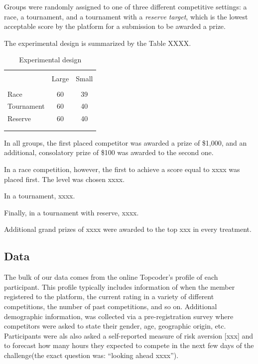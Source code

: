 \documentclass[12pt,]{article}
\begin{document}
Groups were randomly assigned to one of three different competitive
settings: a race, a tournament, and a tournament with a \emph{reserve
target}, which is the lowest acceptable score by the platform for a
submission to be awarded a prize.

The experimental design is summarized by the Table XXXX.

\begin{table}
\centering
\caption{Experimental design}
\label{tab: experimental design}
\begin{tabular}{@{}lcc}
  \\[-1.8ex]\hline \hline \\[-1.8ex]
 & Large & Small \\ 
  \hline \\[-1.86ex]
Race & 60 & 39 \\ 
  Tournament & 60 & 40 \\ 
  Reserve & 60 & 40 \\ 
   \\[-1.8ex]\hline \hline \\[-1.8ex]
\end{tabular}
\end{table}

In all groups, the first placed competitor was awarded a prize of
\$1,000, and an additional, consolatory prize of \$100 was awarded to
the second one.

In a race competition, however, the first to achieve a score equal to
xxxx was placed first. The level was chosen xxxx.

In a tournament, xxxx.

Finally, in a tournament with reserve, xxxx.

Additional grand prizes of xxxx were awarded to the top xxx in every
treatment.

\subsection{Data}\label{data}

The bulk of our data comes from the online Topcoder's profile of each
participant. This profile typically includes information of when the
member registered to the platform, the current rating in a variety of
different competitions, the number of past competitions, and so on.
Additional demographic information, was collected via a pre-registration
survey where competitors were asked to state their gender, age,
geographic origin, etc. Participants were als also asked a self-reported
measure of risk aversion {[}xxx{]} and to forecast how many hours they
expected to compete in the next few days of the challenge(the exact
question was: ``looking ahead xxxx'').
\end{document}
